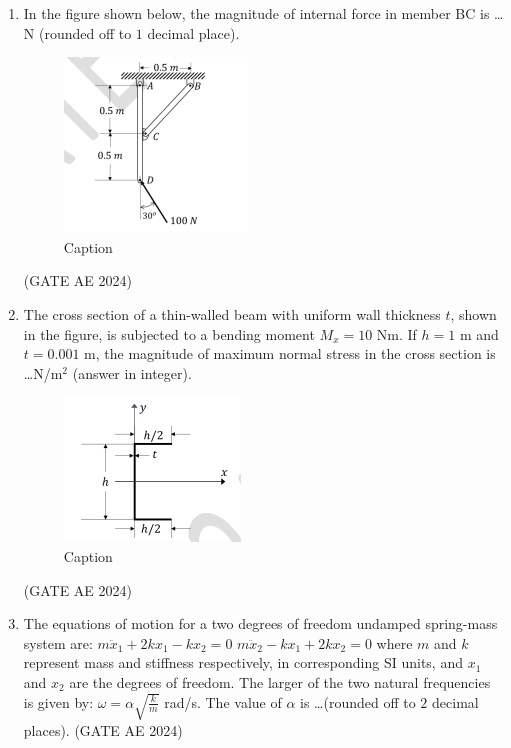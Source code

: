 \documentclass[journal,12pt,onecolumn]{IEEEtran}
\theoremstyle{remark}
\begin{document}
\begin{enumerate}
\item In the figure shown below, the magnitude of internal force in member BC is \dots N (rounded off to $1$ decimal place).
\begin{figure}[H]
    \centering
    \includegraphics[width=0.5\columnwidth]{figs/Screenshot 2025-08-24 062627.png}
    \caption{Caption}
    \label{fig:placeholder}
\end{figure}
\hfill(GATE AE 2024)

\item The cross section of a thin-walled beam with uniform wall thickness $t$, shown in the figure, is subjected to a bending moment $M_x = 10$ Nm. If $h = 1$ m and $t = 0.001$ m, the magnitude of maximum normal stress in the cross section is \dots N/m$^2$ (answer in integer).

\begin{figure}[H]
    \centering
    \includegraphics[width=0.5\columnwidth]{figs/Screenshot 2025-08-24 062733.png}
    \caption{Caption}
    \label{fig:placeholder}
\end{figure}
\hfill(GATE AE 2024)

\item The equations of motion for a two degrees of freedom undamped spring-mass system are:
$
m \ddot{x}_1 + 2k x_1 - k x_2 = 0
$
$
m \ddot{x}_2 - k x_1 + 2k x_2 = 0
$
where $m$ and $k$ represent mass and stiffness respectively, in corresponding SI units, and $x_1$ and $x_2$ are the degrees of freedom. The larger of the two natural frequencies is given by: $\omega = \alpha \sqrt{\frac{k}{m}}$ rad/s. The value of $\alpha$ is \dots (rounded off to $2$ decimal places).
\hfill(GATE AE 2024)


\end{enumerate}
\end{document}
